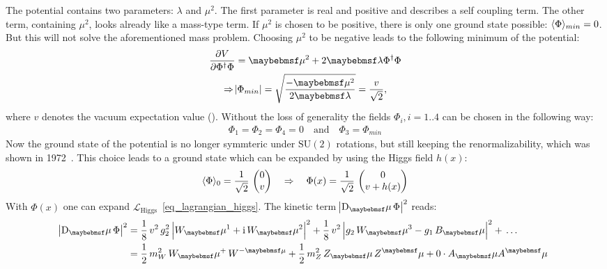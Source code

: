The potential contains two parameters: $\lambda$ and $\mu^2$. The first parameter is real and positive and
describes a self coupling term. The other term, containing $\mu^2$, looks already like a mass-type term.
If $\mu^2$ is chosen to be positive, there is only one ground state possible: $\langle \Phi \rangle_{min}=0$. But this will not solve the
aforementioned mass problem. Choosing $\mu^2$ to be negative leads to the following minimum of the potential: \\
\begin{gather}
\frac{\partial V}{\partial \Phi^\dagger \Phi} = \mu^2 +2 \lambda \Phi^\dagger \Phi \\
\Rightarrow \abs{\Phi_{min}} = \sqrt{\frac{-\mu^2}{2\lambda}} = \frac{v}{\sqrt{2}},
\end{gather}
where $v$ denotes the vacuum expectation value (\VEV). Without the loss of generality the fields $\Phi_i, i=1..4$ can be chosen in the following way:
\begin{gather}
\Phi_1= \Phi_2 = \Phi_4 = 0 \quad \text{and} \quad \Phi_3 = \Phi_{min}
\end{gather}
Now the ground state of the potential is no longer symmteric under $\mathrm{SU}(2)$ rotations, but still keeping the renormalizability, which was shown in 1972~\cite{THOOFT1972189}.
This choice leads to a ground state which can be expanded by using the Higgs field $h(x)$:
\begin{gather}
    \langle \Phi \rangle_0 = \frac{1}{\sqrt 2} \, \begin{pmatrix} 0 \\ v \end{pmatrix} \quad \Rightarrow \quad \Phi(x) = \frac{1}{\sqrt 2} \, \begin{pmatrix} 0 \\ v + h(x) \end{pmatrix}
\end{gather}
With $\Phi(x)$ one can expand $\mathcal{L}_\mathrm{Higgs}$~\ref{eq_lagrangian_higgs}. The kinetic term $\abs{\mathrm{D}\xspace_\mu \, \Phi}^2$ reads:
\begin{align}
    \abs{\mathrm{D}\xspace_\mu \, \Phi}^2 &= \frac 1 8 \, v^2 \, g_2^2 \, \abs{W_\mu^1 + \im \, W_\mu^2}^2 + \frac 1 8 \, v^2 \, \abs{g_2 \, W_\mu^3 - g_1 \, B_\mu}^2 + \, \ldots \\
    &= \frac 1 2 \, m_W^2 \, W_\mu^+ \, W^{- \mu} + \frac 1 2 \, m_Z^2 \, Z_\mu \, Z^\mu + 0 \cdot A_\mu A^\mu\
\end{align}
